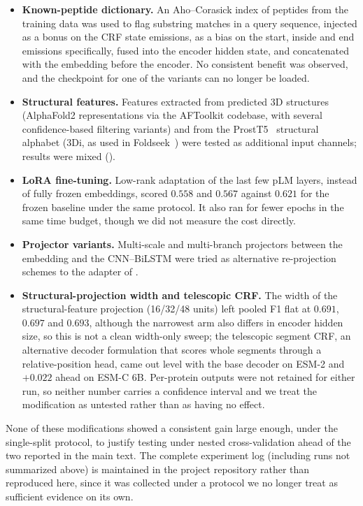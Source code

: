 \documentclass{article}
\begin{document}
\begin{itemize}
  \item \textbf{Known-peptide dictionary.} An Aho--Corasick index of peptides from the training data was used to flag substring matches in a query sequence, injected as a bonus on the CRF state emissions, as a bias on the start, inside and end emissions specifically, fused into the encoder hidden state, and concatenated with the embedding before the encoder. No consistent benefit was observed, and the checkpoint for one of the variants can no longer be loaded.
  \item \textbf{Structural features.} Features extracted from predicted 3D structures (AlphaFold2 representations via the AFToolkit codebase, with several confidence-based filtering variants) and from the ProstT5~\citep{heinzinger2023prostt5} structural alphabet (3Di, as used in Foldseek~\citep{vankempen2024foldseek}) were tested as additional input channels; results were mixed ().
  \item \textbf{LoRA fine-tuning.} Low-rank adaptation of the last few pLM layers, instead of fully frozen embeddings, scored $0.558$ and $0.567$ against $0.621$ for the frozen baseline under the same protocol. It also ran for fewer epochs in the same time budget, though we did not measure the cost directly.
  \item \textbf{Projector variants.} Multi-scale and multi-branch projectors between the embedding and the CNN--BiLSTM were tried as alternative re-projection schemes to the adapter of .
  \item \textbf{Structural-projection width and telescopic CRF.} The width of the structural-feature projection (16/32/48 units) left pooled F1 flat at $0.691$, $0.697$ and $0.693$, although the narrowest arm also differs in encoder hidden size, so this is not a clean width-only sweep; the telescopic segment CRF, an alternative decoder formulation that scores whole segments through a relative-position head, came out level with the base decoder on ESM-2 and $+0.022$ ahead on ESM-C 6B. Per-protein outputs were not retained for either run, so neither number carries a confidence interval and we treat the modification as untested rather than as having no effect.
\end{itemize}

None of these modifications showed a consistent gain large enough, under the single-split protocol, to justify testing under nested cross-validation ahead of the two reported in the main text. The complete experiment log (including runs not summarized above) is maintained in the project repository rather than reproduced here, since it was collected under a protocol we no longer treat as sufficient evidence on its own.
\end{document}
